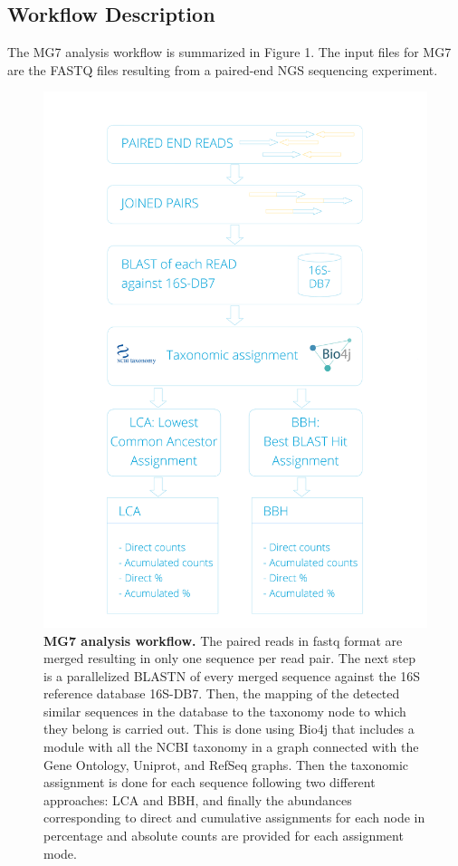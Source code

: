 \documentclass[fleqn,10pt,lineno]{wlpeerj}
\begin{document}
\subsection{Workflow Description}\label{workflow-description}

The MG7 analysis workflow is summarized in Figure 1. The input files for
MG7 are the FASTQ files resulting from a paired-end NGS sequencing
experiment.

\begin{figure}[htbp]
\centering
\includegraphics{./Figure-1.jpg}
\caption{\textbf{MG7 analysis workflow.} The paired reads in fastq
format are merged resulting in only one sequence per read pair. The next
step is a parallelized BLASTN of every merged sequence against the 16S
reference database 16S-DB7. Then, the mapping of the detected similar
sequences in the database to the taxonomy node to which they belong is
carried out. This is done using Bio4j that includes a module with all
the NCBI taxonomy in a graph connected with the Gene Ontology, Uniprot,
and RefSeq graphs. Then the taxonomic assignment is done for each
sequence following two different approaches: LCA and BBH, and finally
the abundances corresponding to direct and cumulative assignments for
each node in percentage and absolute counts are provided for each
assignment mode.}
\end{figure}
\end{document}
